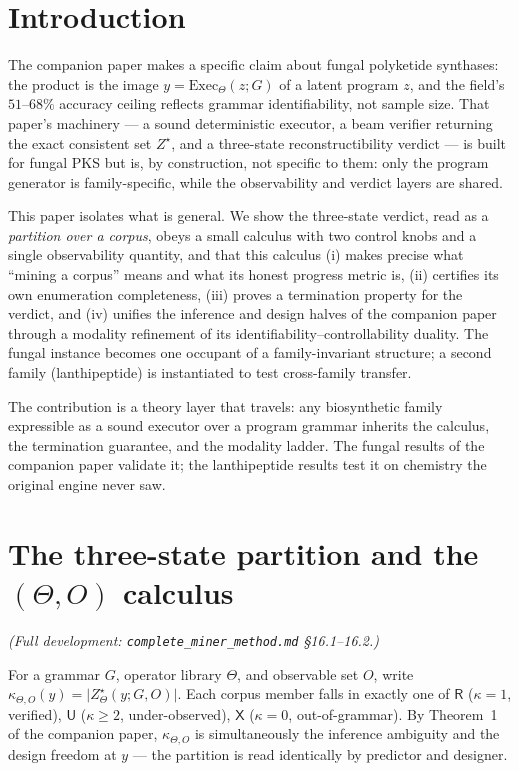 \documentclass[11pt]{article}
\newcommand{\R}{\mathsf{R}}
\newcommand{\U}{\mathsf{U}}
\newcommand{\X}{\mathsf{X}}
\newcommand{\Zstar}{Z^{\star}}
\begin{document}
\section{Introduction}
The companion paper makes a specific claim about fungal polyketide synthases: the product is the image
$y=\mathrm{Exec}_\Theta(z;G)$ of a latent program $z$, and the field's $51$--$68\%$ accuracy ceiling
reflects grammar identifiability, not sample size. That paper's machinery --- a sound deterministic
executor, a beam verifier returning the exact consistent set $\Zstar$, and a three-state
reconstructibility verdict --- is built for fungal PKS but is, by construction, not specific to them:
only the program generator is family-specific, while the observability and verdict layers are shared.

This paper isolates what is general. We show the three-state verdict, read as a \emph{partition over a
corpus}, obeys a small calculus with two control knobs and a single observability quantity, and that
this calculus (i) makes precise what ``mining a corpus'' means and what its honest progress metric is,
(ii) certifies its own enumeration completeness, (iii) proves a termination property for the verdict,
and (iv) unifies the inference and design halves of the companion paper through a modality refinement
of its identifiability--controllability duality. The fungal instance becomes one occupant of a
family-invariant structure; a second family (lanthipeptide) is instantiated to test cross-family
transfer.

The contribution is a theory layer that travels: any biosynthetic family expressible as a sound
executor over a program grammar inherits the calculus, the termination guarantee, and the modality
ladder. The fungal results of the companion paper validate it; the lanthipeptide results test it on
chemistry the original engine never saw.

\section{The three-state partition and the $(\Theta, O)$ calculus}
\emph{(Full development: \texttt{complete\_miner\_method.md} \S16.1--16.2.)}

For a grammar $G$, operator library $\Theta$, and observable set $O$, write
$\kappa_{\Theta,O}(y)=\lvert Z^\star_\Theta(y;G,O)\rvert$. Each corpus member falls in exactly one of
$\R$ ($\kappa=1$, verified), $\U$ ($\kappa\ge2$, under-observed), $\X$ ($\kappa=0$, out-of-grammar). By
Theorem~1 of the companion paper, $\kappa_{\Theta,O}$ is simultaneously the inference ambiguity and the
design freedom at $y$ --- the partition is read identically by predictor and designer.
\end{document}
